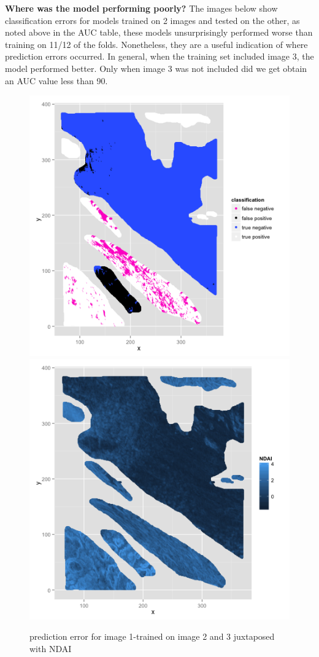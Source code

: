 \documentclass{article}\usepackage[]{graphicx}\usepackage[]{color}
\begin{document}
{\bf Where was the model performing poorly?}
The images below show classification errors for models trained on 2 images and tested on the other, as noted above in the AUC table, these models unsurprisingly performed worse than training on 11/12 of the folds.  Nonetheless, they are a useful indication of where prediction errors occurred.  In general, when the training set included image 3, the model performed better.  Only when image 3 was not included did we get obtain an AUC value less than 90.   
  \begin{figure}[H]
  \includegraphics[width=\linewidth, height = 170pts ]{classification_image1.png}
\endminipage\hfill
{}
  \includegraphics[width=\linewidth, height = 170pts]{NDAI_image1.png}
\endminipage\hfill
\caption{prediction error for image 1-trained on image 2 and 3 juxtaposed with NDAI}
\end{figure}
\end{document}

